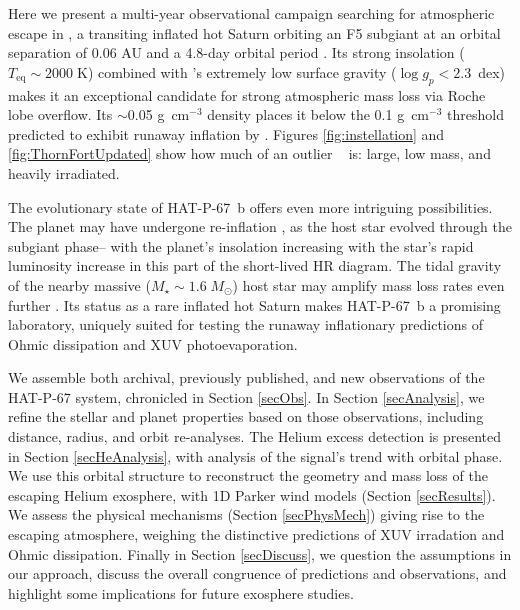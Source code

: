 \documentclass[twocolumn]{aastex631}
\newcommand{\hatpb}{\object{HAT-P-67 b}}
\begin{document}
Here we present a multi-year observational campaign searching for atmospheric escape in , a transiting inflated hot Saturn orbiting an F5 subgiant at an orbital separation of 0.06 AU and a 4.8-day orbital period \citep{2017AJ....153..211Z}.  Its strong insolation ($T_\mathrm{eq}\sim2000\;$K) combined with 's extremely low surface gravity ($\log{g_p}<2.3$~dex) makes it an exceptional candidate for strong atmospheric mass loss via Roche lobe overflow.  Its $\sim$0.05 g~cm$^{-3}$ density places it below the 0.1 g~cm$^{-3}$ threshold predicted to exhibit runaway inflation by \citet{2023ApJ...945L..36T}.  Figures \ref{fig:instellation} and \ref{fig:ThornFortUpdated} show how much of an outlier \hatpb~ is: large, low mass, and heavily irradiated.    

The evolutionary state of HAT-P-67~b offers even more intriguing possibilities.  The planet may have undergone re-inflation \citep{2022AJ....163...53S, 2022AJ....163..120G, 2023arXiv230306728G}, as the host star evolved through the subgiant phase-- with the planet's insolation increasing with the star's rapid luminosity increase in this part of the short-lived HR diagram.  The tidal gravity of the nearby massive ($M_\star \sim1.6\;M_\odot$) host star may amplify mass loss rates even further \citep{2007A&A...472..329E, 2023ApJ...945L..36T}. Its status as a rare inflated hot Saturn makes HAT-P-67~b a promising laboratory, uniquely suited for testing the runaway inflationary predictions of Ohmic dissipation and XUV photoevaporation.

We assemble both archival, previously published, and new observations of the HAT-P-67 system, chronicled in Section \ref{secObs}.  In Section \ref{secAnalysis}, we refine the stellar and planet properties based on those observations, including distance, radius, and orbit re-analyses.  The Helium excess detection is presented in Section \ref{secHeAnalysis}, with analysis of the signal's trend with orbital phase.  We use this orbital structure to reconstruct the geometry and mass loss of the escaping Helium exosphere, with 1D Parker wind models (Section \ref{secResults}).  We assess the physical mechanisms (Section \ref{secPhysMech}) giving rise to the escaping atmosphere, weighing the distinctive predictions of XUV irradation and Ohmic dissipation.  Finally in Section \ref{secDiscuss}, we question the assumptions in our approach, discuss the overall congruence of predictions and observations, and highlight some implications for future exosphere studies.
\end{document}

